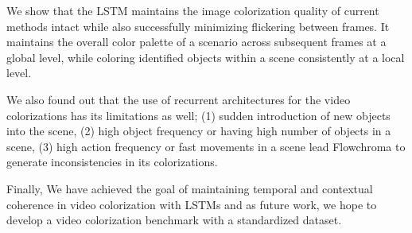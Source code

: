 \documentclass[10pt,twocolumn,letterpaper]{article}
\begin{document}
We show that the LSTM maintains the image colorization quality of current methods intact while also successfully minimizing flickering between frames. It maintains the overall color palette of a scenario across subsequent frames at a global level, while coloring identified objects within a scene consistently at a local level. 

We also found out that the use of recurrent architectures for the video colorizations has its limitations as well; (1) sudden introduction of new objects into the scene, (2) high object frequency or having high number of objects in a scene, (3) high action frequency or fast movements in a scene lead Flowchroma to generate inconsistencies in its colorizations.

Finally, We have achieved the goal of maintaining temporal and contextual coherence in video colorization with LSTMs and as future work, we hope to develop a video colorization benchmark with a standardized dataset.





{\small


}
\end{document}
